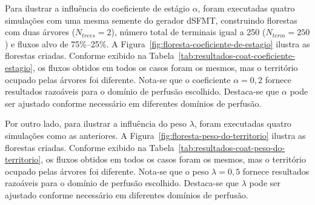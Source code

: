 Para ilustrar a influência do coeficiente de estágio $\alpha$, foram executadas quatro simulações 
com uma mesma semente do gerador dSFMT, construindo florestas com duas árvores ($N_{trees} = 2$),
número total de terminais igual a 250 ($N_{term} = 250$) e fluxos alvo de 75\%--25\%.
A Figura~\ref{fig:floresta-coeficiente-de-estagio}
ilustra as florestas criadas. Conforme exibido na Tabela~\ref{tab:resultados-coat-coeficiente-estagio}, 
os fluxos obtidos em todos os casos foram os mesmos, mas o território ocupado pelas árvores foi diferente.
Nota-se que o coeficiente $\alpha=0,2$ fornece resultados razoáveis para o domínio de perfusão escolhido.
Destaca-se que $\alpha$ pode ser ajustado conforme necessário em diferentes domínios de perfusão.

Por outro lado, para ilustrar a influência do peso $\lambda$, foram executadas quatro simulações como as
anteriores. A Figura~\ref{fig:floresta-peso-do-territorio}
ilustra as florestas criadas. Conforme exibido na Tabela~\ref{tab:resultados-coat-peso-do-territorio}, 
os fluxos obtidos em todos os casos foram os mesmos, mas o território ocupado pelas árvores foi diferente.
Nota-se que o peso $\lambda=0,5$ fornece resultados razoáveis para o domínio de perfusão escolhido.
Destaca-se que $\lambda$ pode ser ajustado conforme necessário em diferentes domínios de perfusão.

\clearpage

